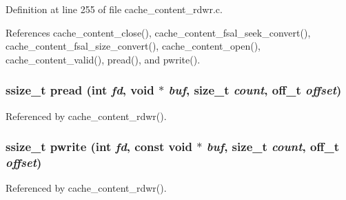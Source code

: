 Definition at line 255 of file cache\_\-content\_\-rdwr.c.

References cache\_\-content\_\-close(), cache\_\-content\_\-fsal\_\-seek\_\-convert(), cache\_\-content\_\-fsal\_\-size\_\-convert(), cache\_\-content\_\-open(), cache\_\-content\_\-valid(), pread(), and pwrite().
\subsubsection{\setlength{\rightskip}{0pt plus 5cm}ssize\_\-t pread (int {\em fd}, void $\ast$ {\em buf}, size\_\-t {\em count}, off\_\-t {\em offset})}\label{cache__content__rdwr_8c_a0}




Referenced by cache\_\-content\_\-rdwr().
\subsubsection{\setlength{\rightskip}{0pt plus 5cm}ssize\_\-t pwrite (int {\em fd}, const void $\ast$ {\em buf}, size\_\-t {\em count}, off\_\-t {\em offset})}\label{cache__content__rdwr_8c_a1}




Referenced by cache\_\-content\_\-rdwr().